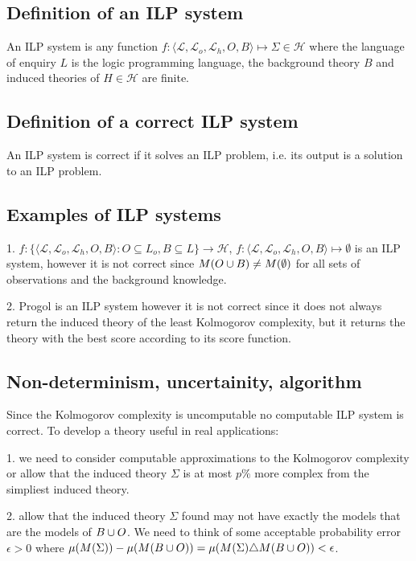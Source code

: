\subsection{Definition of an ILP system}
An ILP system is any function $f:\langle\mathcal{L}, \mathcal{L}_o, \mathcal{L}_h, O, B\rangle \mapsto \Sigma \in \mathcal{H}$ where the language of enquiry $L$ is the logic programming language, the background theory $B$ and induced theories of $H \in \mathcal{H}$ are finite.

\subsection{Definition of a correct ILP system}
An ILP system is correct if it solves an ILP problem, i.e. its output is a solution to an ILP problem.

\subsection{Examples of ILP systems}
1. $f:\{ \langle\mathcal{L}, \mathcal{L}_o, \mathcal{L}_h, O, B\rangle : O \subseteq L_o, B \subseteq L \} \to \mathcal{H}$, $f:\langle\mathcal{L}, \mathcal{L}_o, \mathcal{L}_h, O, B\rangle \mapsto \emptyset$ is an ILP system, however it is not correct since $M(O \cup B) \not= M(\emptyset)$ for all sets of observations and the background knowledge.

2. Progol is an ILP system however it is not correct since it does not always return the induced theory of the least Kolmogorov complexity, but it returns the theory with the best score according to its score function.

\subsection{Non-determinism, uncertainity, algorithm}

Since the Kolmogorov complexity is uncomputable no computable ILP system is correct. To develop a theory useful in real applications:

1. we need to consider computable approximations to the Kolmogorov complexity or allow that the induced theory $\Sigma$ is at most $p\%$ more complex from the simpliest induced theory.

2. allow that the induced theory $\Sigma$ found may not have exactly the models that are the models of $B \cup O$. We need to think of some acceptable probability error $\epsilon>0$ where $\mu(M(\Sigma))-\mu(M(B \cup O)) = \mu(M(\Sigma)  \triangle  M(B \cup O)) < \epsilon$.

